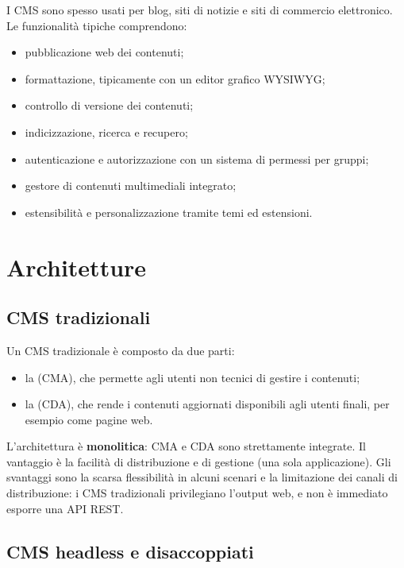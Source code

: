 I CMS sono spesso usati per blog, siti di notizie e siti di commercio
elettronico. Le funzionalità tipiche comprendono:

\begin{itemize}
  \item pubblicazione web dei contenuti;
  \item formattazione, tipicamente con un editor grafico WYSIWYG;
  \item controllo di versione dei contenuti;
  \item indicizzazione, ricerca e recupero;
  \item autenticazione e autorizzazione con un sistema di permessi per gruppi;
  \item gestore di contenuti multimediali integrato;
  \item estensibilità e personalizzazione tramite temi ed estensioni.
\end{itemize}

\section{Architetture}

\subsection{CMS tradizionali}

Un CMS tradizionale è composto da due parti:

\begin{itemize}
  \item la  (CMA), che permette agli
        utenti non tecnici di gestire i contenuti;
  \item la  (CDA), che rende i contenuti
        aggiornati disponibili agli utenti finali, per esempio come pagine web.
\end{itemize}

L'architettura è \textbf{monolitica}: CMA e CDA sono strettamente integrate. Il
vantaggio è la facilità di distribuzione e di gestione (una sola applicazione).
Gli svantaggi sono la scarsa flessibilità in alcuni scenari e la limitazione dei
canali di distribuzione: i CMS tradizionali privilegiano l'output web, e non è
immediato esporre una API REST.

\subsection{CMS headless e disaccoppiati}

